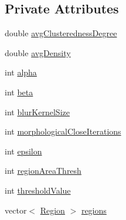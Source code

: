 \subsection*{Private Attributes}
\begin{DoxyCompactItemize}
\item 
double \hyperlink{classmultiscale_1_1analysis_1_1RegionDetector_ad2614f07ff1dfa25af6f7eaa10fe8ea8}{avg\-Clusteredness\-Degree}
\item 
double \hyperlink{classmultiscale_1_1analysis_1_1RegionDetector_a96d0cab2a5cd61b3820c87581fed9548}{avg\-Density}
\item 
int \hyperlink{classmultiscale_1_1analysis_1_1RegionDetector_ab768a3bbfff9835b441a889ab2cb05a6}{alpha}
\item 
int \hyperlink{classmultiscale_1_1analysis_1_1RegionDetector_a23c831170c2264dd7e59067a1a7d3c8e}{beta}
\item 
int \hyperlink{classmultiscale_1_1analysis_1_1RegionDetector_aae6ee0ec7f0a610dd8a906c1eb181bc7}{blur\-Kernel\-Size}
\item 
int \hyperlink{classmultiscale_1_1analysis_1_1RegionDetector_a700a2f299d7c56fbd1fdbec68092f23a}{morphological\-Close\-Iterations}
\item 
int \hyperlink{classmultiscale_1_1analysis_1_1RegionDetector_acf21910fadd7c6ef2810743a78a0aeb9}{epsilon}
\item 
int \hyperlink{classmultiscale_1_1analysis_1_1RegionDetector_a1f637073a3d946d000dceed01412f19a}{region\-Area\-Thresh}
\item 
int \hyperlink{classmultiscale_1_1analysis_1_1RegionDetector_a0f7469d124c0b906d199e00ea5713007}{threshold\-Value}
\item 
vector$<$ \hyperlink{classmultiscale_1_1analysis_1_1Region}{Region} $>$ \hyperlink{classmultiscale_1_1analysis_1_1RegionDetector_aa6517ceb3a58295448d32e6e41499893}{regions}
\end{DoxyCompactItemize}
